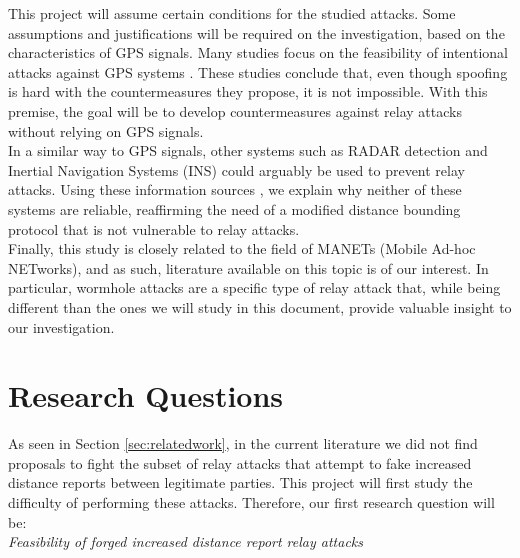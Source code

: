 \documentclass{article}
\begin{document}
This project will assume certain conditions for the studied attacks. Some assumptions and justifications will be required on the investigation, based on the characteristics of GPS signals. Many studies focus on the feasibility of intentional attacks against GPS systems \cite{jafarnia2012gps, warner2003gps, wen2005countermeasures}. These studies conclude that, even though spoofing is hard with the countermeasures they propose, it is not impossible. With this premise, the goal will be to develop countermeasures against relay attacks without relying on GPS signals.\\

In a similar way to GPS signals, other systems such as RADAR detection \cite{cadirci2009rf} and Inertial Navigation Systems (INS) \cite{patent:4085440} could arguably be used to prevent relay attacks. Using these information sources \cite{cadirci2009rf, patent:4085440}, we explain why neither of these systems are reliable, reaffirming the need of a modified distance bounding protocol that is not vulnerable to relay attacks.\\

Finally, this study is closely related to the field of MANETs (Mobile Ad-hoc NETworks), and as such, literature available on this topic is of our interest. In particular, wormhole attacks \cite{goyal2010literature, hu2006wormhole, maheshwari2007detecting} are a specific type of relay attack that, while being different than the ones we will study in this document, provide valuable insight to our investigation.\\














\section{Research Questions}
\label{sec:researchquestions}

As seen in Section \ref{sec:relatedwork}, in the current literature we did not find proposals to fight the subset of relay attacks that attempt to fake increased distance reports between legitimate parties. This project will first study the difficulty of performing these attacks. Therefore, our first research question will be:\\

\emph{Feasibility of forged increased distance report relay attacks}\\
\end{document}
